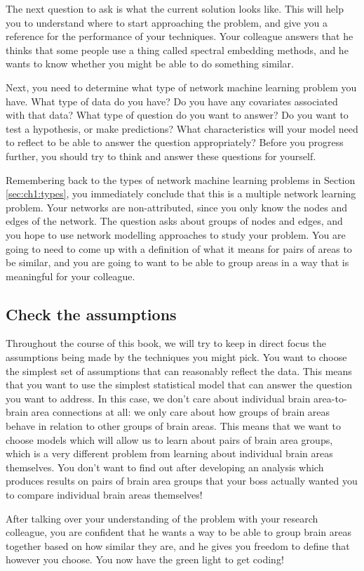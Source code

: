 The next question to ask is what the current solution looks like. This will help you to understand where to start approaching the problem, and give you a reference for the performance of your techniques. Your colleague answers that he thinks that some people use a thing called spectral embedding methods, and he wants to know whether you might be able to do something similar. 

Next, you need to determine what type of network machine learning problem you have. What type of data do you have? Do you have any covariates associated with that data? What type of question do you want to answer? Do you want to test a hypothesis, or make predictions? What characteristics will your model need to reflect to be able to answer the question appropriately? Before you progress further, you should try to think and answer these questions for yourself. 

Remembering back to the types of network machine learning problems in Section \ref{sec:ch1:types}, you immediately conclude that this is a multiple network learning problem. Your networks are non-attributed, since you only know the nodes and edges of the network. The question asks about groups of nodes and edges, and you hope to use network modelling approaches to study your problem. You are going to need to come up with a definition of what it means for pairs of areas to be similar, and you are going to want to be able to group areas in a way that is meaningful for your colleague.

\subsection{Check the assumptions}

Throughout the course of this book, we will try to keep in direct focus the assumptions being made by the techniques you might pick. You want to choose the simplest set of assumptions that can reasonably reflect the data. This means that you want to use the simplest statistical model that can answer the question you want to address. In this case, we don't care about individual brain area-to-brain area connections at all: we only care about how groups of brain areas behave in relation to other groups of brain areas. This means that we want to choose models which will allow us to learn about pairs of brain area groups, which is a very different problem from learning about individual brain areas themselves. You don't want to find out after developing an analysis which produces results on pairs of brain area groups that your boss actually wanted you to compare individual brain areas themselves!

After talking over your understanding of the problem with your research colleague, you are confident that he wants a way to be able to group brain areas together based on how similar they are, and he gives you freedom to define that however you choose. You now have the green light to get coding!

\newpage